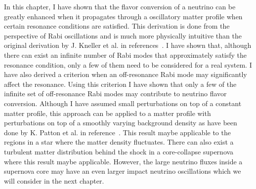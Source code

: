 In this chapter, I have shown that the flavor conversion of a neutrino can be greatly enhanced when it propagates through a oscillatory matter profile when certain resonance conditions are satisfied. This derivation is done from the perspective of Rabi oscillations and is much more physically intuitive than the original derivation by J. Kneller et al. in references~\cite{Kneller2013, Patton2014}. I have shown that, although there can exist an infinite number of Rabi modes that approximately satisfy the resonance condition, only a few of them need to be considered for a real system. I have also derived a criterion when an off-resonance Rabi mode may significantly affect the resonance. Using this criterion I have shown that only a few of the infinite set of off-resonance Rabi modes may contribute to neutrino flavor conversion. Although I have assumed small perturbations on top of a constant matter profile, this approach can be applied to a matter profile with perturbations on top of a smoothly varying background density as have been done by K. Patton et al. in reference~\cite{Patton:2014lza}. This result maybe applicable to the regions in a star where the matter density fluctuates. There can also exist a turbulent matter distribution behind the shock in a core-collapse supernova where this result maybe applicable. However, the large neutrino fluxes inside a supernova core may have an even larger impact neutrino oscillations which we will consider in the next chapter.


